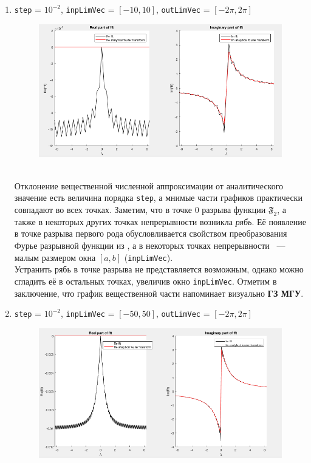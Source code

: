 \documentclass[11pt, oneside, final]{article}
\numberwithin{equation}{section}
\begin{document}
    \begin{enumerate}
        \item
        \label{it:noise}
        \texttt{step} = \(10^{-2}\), \texttt{inpLimVec} = \( [-10, 10] \), \texttt{outLimVec} = \( [-2\pi, 2\pi] \)
        \begin{figure}[!h]
            \centering
            \includegraphics[width=\linewidth]{f2fig1}
            \label{pic:f2:1}
        \end{figure} \\
        Отклонение вещественной численной аппроксимации от аналитического значение есть величина порядка \texttt{step},
        а мнимые части графиков практически совпадают во всех точках.
        Заметим, что в точке 0 разрыва функции \(\mathfrak{F_2}\), а также в некоторых других точках непрерывности возникла \emph{рябь}.
        Её появление в точке разрыва первого рода обусловливается свойством преобразования Фурье разрывной функции из \cite{Roublev:fourier},
        а в некоторых точках непрерывности ~--- малым размером окна \([a, b]\) (\texttt{inpLimVec}).\\
        Устранить рябь в точке разрыва не представляется возможным, однако можно сгладить её в остальных точках, увеличив окно \texttt{inpLimVec}.
        Отметим в заключение, что график вещественной части напоминает визуально \textbf{ГЗ МГУ}.
        \clearpage
        \item
        \label{it:lessnoise}
        \texttt{step} = \(10^{-2}\), \texttt{inpLimVec} = \( [-50, 50] \), \texttt{outLimVec} = \( [-2\pi, 2\pi] \)
        \begin{figure}[!h]
            \centering
            \includegraphics[width=\linewidth]{f2fig2}

\end{figure}
\end{enumerate}
\end{document}
